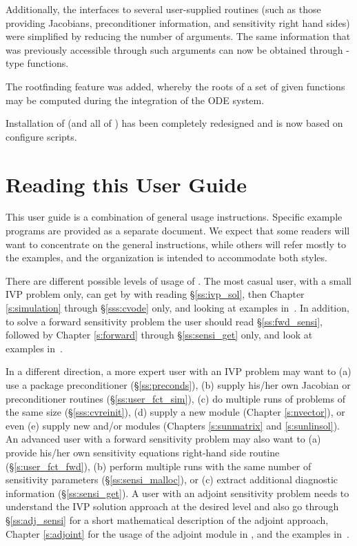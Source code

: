 Additionally, the interfaces to several user-supplied routines
(such as those providing Jacobians, preconditioner information, and
sensitivity right hand sides) were simplified by reducing the number
of arguments. The same information that was previously accessible
through such arguments can now be obtained through {-type}
functions.

The rootfinding feature was added, whereby the roots of a set of given
functions may be computed during the integration of the ODE system.

Installation of {\cvodes} (and all of {\sundials}) has been completely 
redesigned and is now based on configure scripts.


\section{Reading this User Guide}\label{ss:reading}

This user guide is a combination of general usage instructions. 
Specific example programs are provided as a separate document.  
We expect that some readers will want to
concentrate on the general instructions, while others will refer
mostly to the examples, and the organization is intended to
accommodate both styles.

There are different possible levels of usage of {\cvodes}. The most
casual user, with a small IVP problem only, can get by with reading
\S\ref{ss:ivp_sol}, then Chapter \ref{s:simulation} through
\S\ref{sss:cvode} only, and looking at examples in~\cite{cvodes_ex}.
In addition, to solve a forward sensitivity problem the user should read 
\S\ref{ss:fwd_sensi}, followed by Chapter \ref{s:forward} through 
\S\ref{ss:sensi_get} only, and look at examples in~\cite{cvodes_ex}.

In a different direction, a more expert user with an IVP problem may want to
(a) use a package preconditioner (\S\ref{ss:preconds}), 
(b) supply his/her own Jacobian or preconditioner routines (\S\ref{ss:user_fct_sim}),
(c) do multiple runs of problems of the same size (\S\ref{sss:cvreinit}), 
(d) supply a new {\nvector} module (Chapter \ref{s:nvector}), or even 
(e) supply new {\sunlinsol} and/or {\sunmatrix} modules (Chapters
\ref{s:sunmatrix} and \ref{s:sunlinsol}).
%
An advanced user with a forward sensitivity problem may also want to
(a) provide his/her own sensitivity equations right-hand side routine
(\S\ref{s:user_fct_fwd}), (b) perform multiple runs with the same number of
sensitivity parameters (\S\ref{ss:sensi_malloc}), or (c) extract additional
diagnostic information (\S\ref{ss:sensi_get}).
%
A user with an adjoint sensitivity problem needs to understand the IVP 
solution approach at the desired level and also go through 
\S\ref{ss:adj_sensi} for a short mathematical description of the adjoint
approach, Chapter \ref{s:adjoint} for the usage of the adjoint module in {\cvodes},
and the examples in~\cite{cvodes_ex}.


